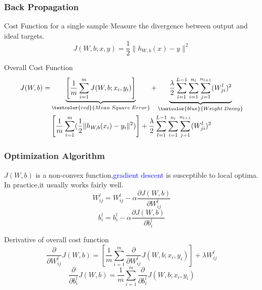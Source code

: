 \documentclass{beamer}
\begin{document}
\begin{CJK*}{UTF8}{gbsn}
\begin{frame}\frametitle{Back Propagation}
\begin{exampleblock}{Cost Function for a single sample}
Measure the divergence between output and ideal targets.
\begin{equation}
J(W,b;x,y)=\frac{1}{2}\|h_{W,b}(x)-y\|^2
\end{equation}
\end{exampleblock}
\begin{exampleblock}{Overall Cost Function}
\begin{equation}
\begin{split}
J(W,b)=&\underbrace{\left[\frac{1}{m}\sum_{i=1}^mJ(W,b;x_i,y_i)\right]}_{\textcolor{red}{Mean\;Square\; Error}}+\underbrace{\frac{\lambda}{2}\sum_{l=1}^{L-1}\sum_{i=1}^{n_l}\sum_{j=1}^{n_{l+1}}(W_{ji}^l)^2}_{\textcolor{blue}{Weight\;Decay}}\\
&\left[\frac{1}{m}\sum_{i=1}^m(\frac{1}{2}\|h_{W,b}(x_i)-y_i\|^2)\right]+\frac{\lambda}{2}\sum_{l=1}^{L-1}\sum_{i=1}^{n_l}\sum_{j=1}^{n_{l+1}}(W_{ji}^l)^2
\end{split}
\end{equation}
\end{exampleblock}
\end{frame}

\begin{frame}\frametitle{Optimization Algorithm}
$J(W,b)$ is a non-convex function,\textcolor{blue}{gradient descent} is susceptible to local optima. In practice,it usually works fairly well.\\
\begin{equation}
W_{ij}^l=W_{ij}^l-\alpha\frac{\partial J(W,b)}{\partial W_{ij}^l}
\end{equation}
\begin{equation}
b_{i}^l=b_{i}^l-\alpha\frac{\partial J(W,b)}{\partial b_{i}^l}
\end{equation}

\begin{alertblock}{Derivative of overall cost function}
\begin{equation}
\frac{\partial}{\partial W_{ij}^l} J(W,b)=\left[\frac{1}{m}\sum_{i=1}^m\frac{\partial}{\partial W_{ij}^l} J(W,b;x_i,y_i)\right]+\lambda W_{ij}^l
\end{equation}
\begin{equation}
\frac{\partial}{\partial b_{i}^l} J(W,b)=\frac{1}{m}\sum_{i=1}^m\frac{\partial}{\partial b_{i}^l} J(W,b;x_i,y_i)
\end{equation}
\end{alertblock}
\end{frame}



\end{CJK*}
\end{document}

